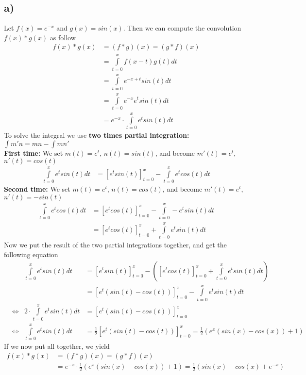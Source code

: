 \documentclass[a4paper]{article}
\begin{document}
    \subsection*{a)}
        Let $f(x) = e^{-x}$ and $g(x) = sin(x)$.
        Then we can compute the convolution $f(x) \ast g(x)$ as follow
        \begin{align}
            f(x) \ast g(x) &= (f \ast g)(x) = (g \ast f)(x)\\
            &= \int\limits_{t=0}^x f(x-t) g(t) dt\\
            &= \int\limits_{t=0}^x e^{-x+t} sin(t) dt\\
            &= \int\limits_{t=0}^x e^{-x} e^{t} sin(t) dt\\
            &= e^{-x} \cdot \int\limits_{t=0}^x e^{t} sin(t) dt
        \end{align}
        To solve the integral we use \textbf{two times partial integration:} $\int m'n = mn - \int mn'$\\
        \textbf{First time:} We set $m(t) = e^t$, $n(t) = sin(t)$, and become $m'(t) = e^t$, $n'(t) = cos(t)$
        \begin{align}
            \int\limits_{t=0}^x e^{t} sin(t) dt &= \left[ e^{t} sin(t) \right]_{t=0}^x - \int\limits_{t=0}^x e^{t} cos(t) dt
        \end{align}
        \textbf{Second time:} We set $m(t) = e^t$, $n(t) = cos(t)$, and become $m'(t) = e^t$, $n'(t) = -sin(t)$
        \begin{align}
            \int\limits_{t=0}^x e^{t} cos(t) dt &= \left[ e^{t} cos(t) \right]_{t=0}^x - \int\limits_{t=0}^x - e^{t} sin(t) dt\\
            &= \left[ e^{t} cos(t) \right]_{t=0}^x + \int\limits_{t=0}^x e^{t} sin(t) dt
        \end{align}
        Now we put the result of the two partial integrations together, and get the following equation
        \begin{align}
            & & \int\limits_{t=0}^x e^{t} sin(t) dt &= \left[ e^{t} sin(t) \right]_{t=0}^x - \left( \left[ e^{t} cos(t) \right]_{t=0}^x + \int\limits_{t=0}^x e^{t} sin(t) dt \right)\\
            & & &= \left[ e^{t} \left( sin(t) - cos(t) \right) \right]_{t=0}^x - \int\limits_{t=0}^x e^{t} sin(t) dt\\
            &\Leftrightarrow & 2 \cdot \int\limits_{t=0}^x e^{t} sin(t) dt &= \left[ e^{t} \left( sin(t) - cos(t) \right) \right]_{t=0}^x\\
            &\Leftrightarrow & \int\limits_{t=0}^x e^{t} sin(t) dt &= \frac{1}{2} \left[ e^{t} \left( sin(t) - cos(t) \right) \right]_{t=0}^x
            = \frac{1}{2} \left( e^{x} \left( sin(x) - cos(x) \right) + 1 \right)
        \end{align}
        If we now put all together, we yield
        \begin{align}
            f(x) \ast g(x) &= (f \ast g)(x) = (g \ast f)(x)\\
            &= e^{-x} \cdot \frac{1}{2} \left( e^{x} \left( sin(x) - cos(x) \right) + 1 \right)
            = \frac{1}{2} \left( sin(x) - cos(x) + e^{-x} \right)
        \end{align}
        
\end{document}
